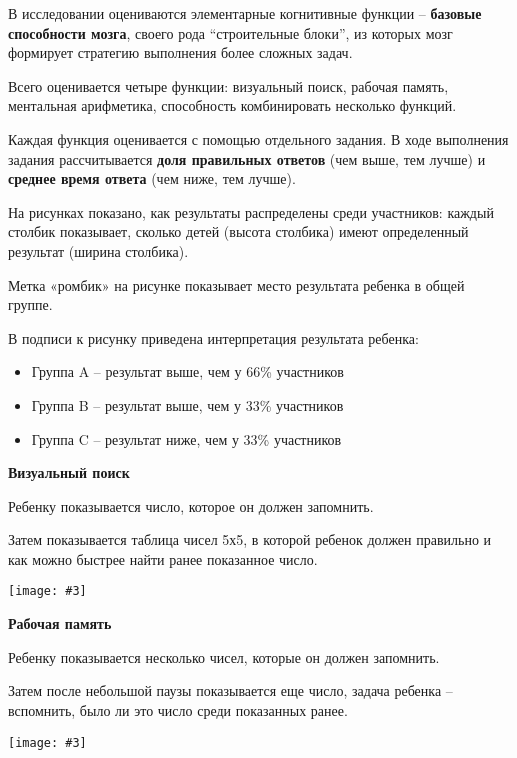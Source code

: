 \documentclass[10pt]{article}
\newcommand{\visualsearch}[3]{
    \begin{center}
        \textbf{\large #1}
    \end{center}

    \vspace{1em}

    #2

    \vspace{1em}

    \texttt{[image: \#3]}
}
\begin{document}
\vspace{1em}

В исследовании оцениваются элементарные когнитивные функции -- \textbf{базовые способности мозга}, своего рода ``строительные блоки'', из которых мозг формирует стратегию выполнения более сложных задач.

Всего оценивается четыре функции: визуальный поиск, рабочая память, ментальная арифметика, способность комбинировать несколько функций.

Каждая функция оценивается с помощью отдельного задания. В ходе выполнения задания рассчитывается \textbf{доля правильных ответов} (чем выше, тем лучше) и \textbf{среднее время ответа} (чем ниже, тем лучше).

На рисунках показано, как результаты распределены среди участников: каждый столбик показывает, сколько детей (высота столбика) имеют определенный результат (ширина столбика).

Метка «ромбик» на рисунке показывает место результата ребенка в общей группе.

В подписи к рисунку приведена интерпретация результата ребенка:

\begin{itemize}
  \item Группа A -- результат выше, чем у 66\% участников
  \item Группа B -- результат выше, чем у 33\% участников
  \item Группа C -- результат ниже, чем у 33\% участников
\end{itemize}

\vspace{0.5em}

\visualsearch{Визуальный поиск}{
Ребенку показывается число, которое он должен запомнить.

\vspace{0.5em}

Затем показывается таблица чисел 5х5, в которой ребенок должен правильно и как можно быстрее найти ранее показанное число.
}{VisualSearch.png}

\vspace{0.5em}

\visualsearch{Рабочая память}{
Ребенку показывается несколько чисел, которые он должен запомнить.

\vspace{0.5em}

Затем после небольшой паузы показывается еще число, задача ребенка – вспомнить, было ли это число среди показанных ранее.
}{WorkingMemory.png}
\end{document}
